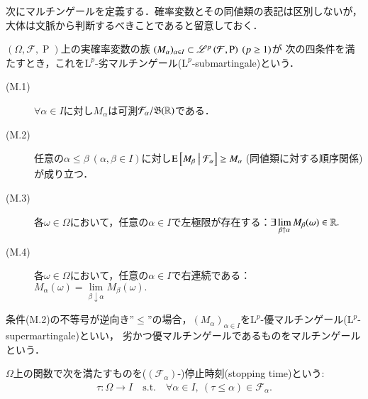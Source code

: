 	次にマルチンゲールを定義する．確率変数とその同値類の表記は区別しないが，大体は文脈から判断するべきことであると留意しておく．
	\begin{itembox}[l]{}
		\begin{dfn}[マルチンゲール]
			$(\Omega,\mathcal{F},\operatorname{P})$上の実確率変数の族
			$(M_\alpha)_{\alpha \in I} \subset \mathscr{L}^{p} \left(\mathcal{F},\operatorname{P}\right)\ (p \geq 1)$が
			次の四条件を満たすとき，これを$\mathrm{L}^p$-劣マルチンゲール($\mathrm{L}^p$-submartingale)という．
			\begin{description}
				\item[(M.1)] $\forall \alpha \in I$に対し$M_\alpha$は可測$\mathcal{F}_\alpha/\mathfrak{B}(\mathbb{R})$である．
				\item[(M.2)] 任意の$\alpha \leq \beta\ (\alpha,\beta \in I)$に対し$\cexp{M_\beta}{\mathcal{F}_\alpha} \geq M_\alpha\ $({\scriptsize 同値類に対する順序関係})が成り立つ．
				\item[(M.3)] 各$\omega \in \Omega$において，任意の$\alpha \in I$で左極限が存在する：$\exists \lim\limits_{\beta \uparrow \alpha} M_\beta(\omega) \in \mathbb{R}.$
				\item[(M.4)] 各$\omega \in \Omega$において，任意の$\alpha \in I$で右連続である：$M_\alpha(\omega) = \lim\limits_{\beta \downarrow \alpha} M_\beta(\omega).$
			\end{description}
			条件(M.2)の不等号が逆向き''$\leq$''の場合，$(M_\alpha)_{\alpha \in I}$を$\mathrm{L}^p$-優マルチンゲール($\mathrm{L}^p$-supermartingale)といい，
			劣かつ優マルチンゲールであるものをマルチンゲールという．
			\label{dfn:martingale}
		\end{dfn}
	\end{itembox}
	
	\begin{itembox}[l]{}
		\begin{dfn}[停止時刻]
			$\Omega$上の関数で次を満たすものを($(\mathcal{F}_\alpha)$-)停止時刻(stopping time)という:
			\begin{align}
				\tau:\Omega \longrightarrow I\quad \mathrm{s.t.}\quad \forall \alpha \in I,\ (\tau \leq \alpha) \in \mathcal{F}_\alpha.
			\end{align}
		\end{dfn}
	\end{itembox}
	
